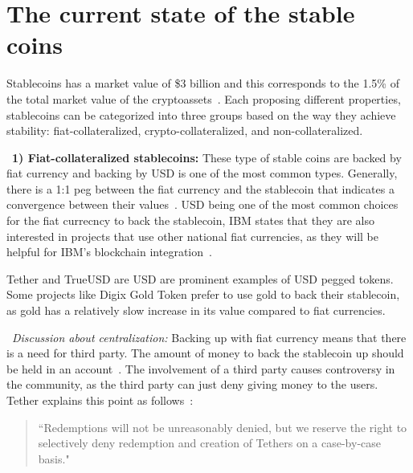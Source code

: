 

\section{The current state of the stable coins} %

Stablecoins has a market value of \$3 billion and this corresponds to the 1.5\% of the total market value of the cryptoassets~\cite{report}. Each proposing different properties, stablecoins can be categorized into three groups based on the way they achieve stability: fiat-collateralized, crypto-collateralized, and non-collateralized.

~\textbf{1) Fiat-collateralized stablecoins:} These type of stable coins are backed by fiat currency and backing by USD is one of the most common types. Generally, there is a 1:1 peg between the fiat currency and the stablecoin that indicates a convergence between their values~\cite{linkedin}. USD being one of the most common choices for the fiat currecncy to back the stablecoin, IBM states that they are also interested in projects that use other national fiat currencies, as they will be helpful for IBM's blockchain integration~\cite{cointelegraph}.


Tether and TrueUSD are USD are prominent examples of USD pegged tokens. Some projects like Digix Gold Token prefer to use gold to back their stablecoin, as gold has a relatively slow increase in its value compared to fiat currencies. %

~\textit{Discussion about centralization:} Backing up with fiat currency means that there is a need for third party. The amount of money to back the stablecoin up should be held in an account~\cite{techrev}. The involvement of a third party causes controversy in the community, as the third party can just deny giving money to the users. Tether explains this point as follows~\cite{cryptoinsider}:

\begin{quote}
``Redemptions will not be unreasonably denied, but we reserve the right to selectively deny redemption and creation of Tethers on a case-by-case basis."
\end{quote}

